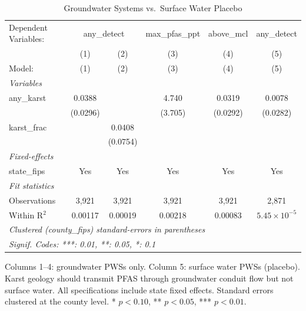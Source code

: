 
\begin{table}[htbp]
   \caption{\label{tab:gw_sw} Groundwater Systems vs.~Surface Water Placebo}
   \centering
   \begin{tabular}{lccccc}
      \tabularnewline \midrule \midrule
      Dependent Variables: & \multicolumn{2}{c}{any\_detect} & max\_pfas\_ppt & above\_mcl & any\_detect\\
                   & (1)      & (2)      & (3)     & (4)      & (5) \\   
      Model:       & (1)      & (2)      & (3)     & (4)      & (5)\\  
      \midrule
      \emph{Variables}\\
      any\_karst   & 0.0388   &          & 4.740   & 0.0319   & 0.0078\\   
                   & (0.0296) &          & (3.705) & (0.0292) & (0.0282)\\   
      karst\_frac  &          & 0.0408   &         &          &   \\   
                   &          & (0.0754) &         &          &   \\   
      \midrule
      \emph{Fixed-effects}\\
      state\_fips  & Yes      & Yes      & Yes     & Yes      & Yes\\  
      \midrule
      \emph{Fit statistics}\\
      Observations & 3,921    & 3,921    & 3,921   & 3,921    & 2,871\\  
      Within R$^2$ & 0.00117  & 0.00019  & 0.00218 & 0.00083  & $5.45\times 10^{-5}$\\   
      \midrule \midrule
      \multicolumn{6}{l}{\emph{Clustered (county\_fips) standard-errors in parentheses}}\\
      \multicolumn{6}{l}{\emph{Signif. Codes: ***: 0.01, **: 0.05, *: 0.1}}\\
   \end{tabular}
   
   \par \raggedright 
   Columns 1--4: groundwater PWSs only. Column 5: surface water PWSs (placebo). Karst geology should transmit PFAS through groundwater conduit flow but not surface water. All specifications include state fixed effects. Standard errors clustered at the county level. * $p<0.10$, ** $p<0.05$, *** $p<0.01$.
\end{table}


